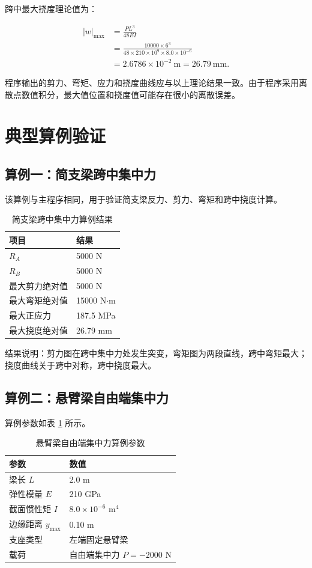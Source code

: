 \documentclass[UTF8,a4paper,12pt]{ctexart}
\numberwithin{equation}{section}
\begin{document}
跨中最大挠度理论值为：

\begin{align}
|w|_{\max}
&=\frac{PL^3}{48EI}\\
&=\frac{10000\times6^3}{48\times210\times10^9\times8.0\times10^{-6}}\\
&=2.6786\times10^{-2}\ \text{m}=26.79\ \text{mm}.
\end{align}

程序输出的剪力、弯矩、应力和挠度曲线应与以上理论结果一致。由于程序采用离散点数值积分，最大值位置和挠度值可能存在很小的离散误差。

\section{典型算例验证}

\subsection{算例一：简支梁跨中集中力}

该算例与主程序相同，用于验证简支梁反力、剪力、弯矩和跨中挠度计算。

\begin{table}[H]
\centering
\caption{简支梁跨中集中力算例结果}
\begin{tabular}{ll}
\toprule
项目 & 结果 \\
\midrule
$R_A$ & 5000 N \\
$R_B$ & 5000 N \\
最大剪力绝对值 & 5000 N \\
最大弯矩绝对值 & 15000 N$\cdot$m \\
最大正应力 & 187.5 MPa \\
最大挠度绝对值 & 26.79 mm \\
\bottomrule
\end{tabular}
\end{table}

结果说明：剪力图在跨中集中力处发生突变，弯矩图为两段直线，跨中弯矩最大；挠度曲线关于跨中对称，跨中挠度最大。

\subsection{算例二：悬臂梁自由端集中力}

算例参数如表 \ref{tab:cantilever-param} 所示。

\begin{table}[H]
\centering
\caption{悬臂梁自由端集中力算例参数}
\label{tab:cantilever-param}
\begin{tabular}{ll}
\toprule
参数 & 数值 \\
\midrule
梁长 $L$ & 2.0 m \\
弹性模量 $E$ & 210 GPa \\
截面惯性矩 $I$ & $8.0\times10^{-6}$ m$^4$ \\
边缘距离 $y_{\max}$ & 0.10 m \\
支座类型 & 左端固定悬臂梁 \\
载荷 & 自由端集中力 $P=-2000$ N \\
\bottomrule
\end{tabular}
\end{table}
\end{document}
